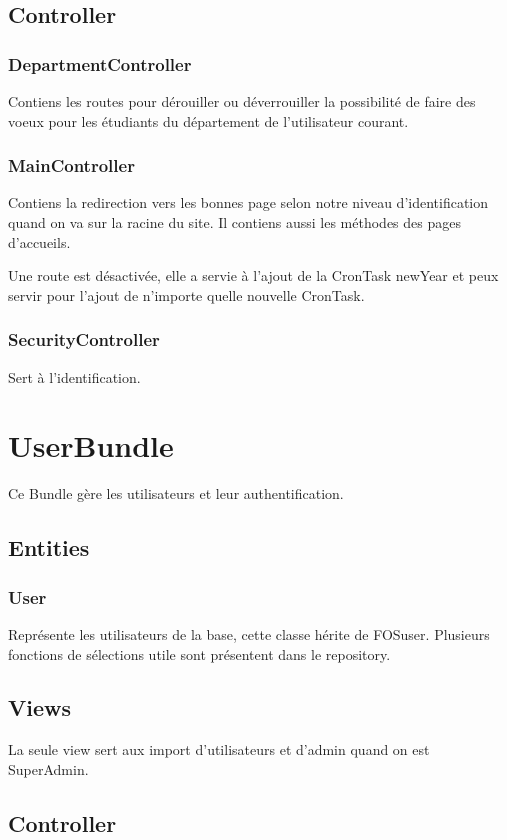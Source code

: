 \subsection{Controller}
\subsubsection{DepartmentController}
Contiens les routes pour dérouiller ou déverrouiller la possibilité de faire des voeux pour les étudiants du département de l'utilisateur courant.

\subsubsection{MainController}
Contiens la redirection vers les bonnes page selon notre niveau d'identification quand on va sur la racine du site.
Il contiens aussi les méthodes des pages d'accueils.

Une route est désactivée, elle a servie à l'ajout de la CronTask newYear et peux servir pour l'ajout de n'importe quelle nouvelle CronTask.

\subsubsection{SecurityController}
Sert à l'identification.

\section{UserBundle}
Ce Bundle gère les utilisateurs et leur authentification.

\subsection{Entities}
\subsubsection{User}
Représente les utilisateurs de la base, cette classe hérite de FOSuser. Plusieurs fonctions de sélections utile sont présentent dans le repository.

\subsection{Views}
La seule view sert aux import d'utilisateurs et d'admin quand on est SuperAdmin.

\subsection{Controller}
